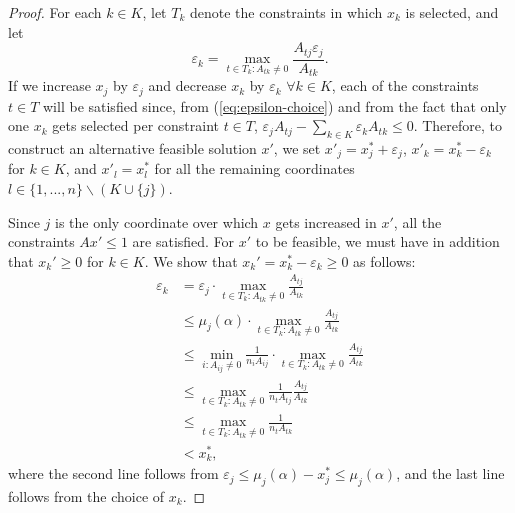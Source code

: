 \documentclass[11pt]{article}
\begin{document}
\begin{proof}
For each $k\in K$, let $T_k$ denote the constraints in which $x_k$ is selected, and let 
\begin{equation}
\varepsilon_k = \max_{t\in T_k: A_{tk}\neq 0} \dfrac{A_{tj}\varepsilon_j}{A_{tk}}.\label{eq:epsilon-choice}
\end{equation}
If we increase $x_j$ by $\varepsilon_j$ and decrease $x_k$ by $\varepsilon_k$ $\forall k\in K$, each of the constraints $t\in T$ will be satisfied since, from (\ref{eq:epsilon-choice}) and from the fact that only one $x_k$ gets selected per constraint $t\in T$, $\varepsilon_j A_{tj}-\sum_{k\in K}\varepsilon_k A_{tk}\leq 0$. Therefore, to construct an alternative feasible solution $x'$, we set $x'_{j}=x_j^*+\varepsilon_j$, $x'_k = x_k^*-\varepsilon_k$ for $k\in K$, and $x'_l = x_l^*$ for all the remaining coordinates $l\in\{1,...,n\}\backslash (K \cup\{j\})$. 

Since $j$ is the only coordinate over which $x$ gets increased in $x'$, all the constraints $Ax'\leq 1$ are satisfied. For $x'$ to be feasible, we must have in addition that $x_k'\geq 0$ for $k\in K$. 
We show that $x_k' = x^*_k - \varepsilon_k \geq 0$ as follows:
\begin{align*}
\varepsilon_k &= \varepsilon_j \cdot \max_{t\in T_k: A_{tk}\neq 0}\frac{A_{tj}}{A_{tk}}\\
&\leq \mu_j(\alpha)\cdot \max_{t\in T_k: A_{tk}\neq 0}\frac{A_{tj}}{A_{tk}}\\
& \leq \min_{i: A_{ij}\neq 0}\frac{1}{n_i A_{ij}}\cdot \max_{t\in T_k: A_{tk}\neq 0}\frac{A_{tj}}{A_{tk}}\\
& \leq \max_{t\in T_k: A_{tk}\neq 0}\frac{1}{n_t A_{tj}}\frac{A_{tj}}{A_{tk}}\\
&\leq \max_{t\in T_k: A_{tk}\neq 0}\frac{1}{n_t A_{tk}}\\
&< x_k^*,
\end{align*}
where the second line follows from $\varepsilon_j \leq \mu_j(\alpha)-x_j^*\leq \mu_j(\alpha)$, and the last line follows from the choice of $x_k$.


\end{proof}
\end{document}
